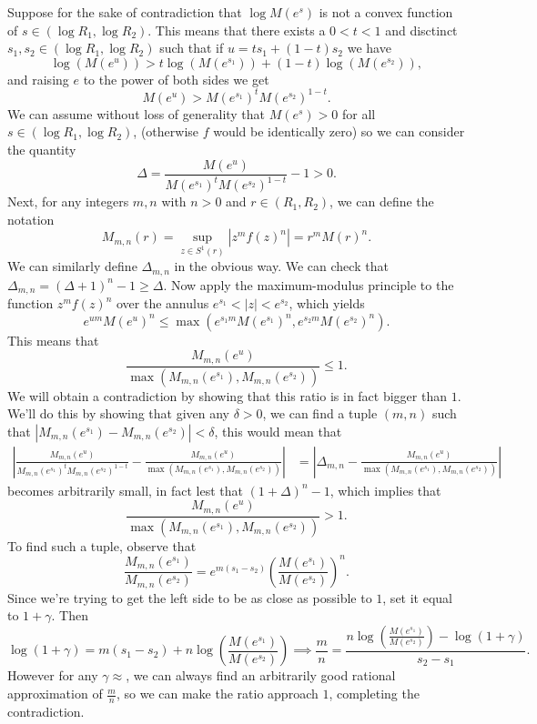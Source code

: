 \documentclass[11pt,letterpaper]{article}
\begin{document}
\begin{solution}
    Suppose for the sake of contradiction that $\log M(e^s)$ is not a convex function of $s\in (\log R_1,\log R_2)$. This means that there exists a $0 < t < 1$ and disctinct $s_1,s_2\in (\log R_1,\log R_2)$ such that if $u=ts_1+(1-t)s_2$ we have
    \[
        \log(M(e^u)) > t\log(M(e^{s_1}))+(1-t)\log(M(e^{s_2})),
    \] 
    and raising $e$ to the power of both sides we get
    \[
        M(e^u) > M(e^{s_1})^tM(e^{s_2})^{1-t}.
    \] 
    We can assume without loss of generality that $M(e^s)>0$ for all $s\in (\log R_1,\log R_2)$, (otherwise $f$ would be identically zero) so we can consider the quantity
    \[
        \Delta = \frac{M(e^u)}{M(e^{s_1})^t M(e^{s_2})^{1-t}}-1 > 0.
    \] 
    Next, for any integers $m,n$ with $n>0$ and $r\in (R_1,R_2)$, we can define the notation
    \[
        M_{m,n}(r) = \sup_{z\in S^1(r)} |z^mf(z)^n| = r^mM(r)^n.
    \] 
    We can similarly define $\Delta_{m,n}$ in the obvious way. We can check that $\Delta_{m,n}=(\Delta+1)^n-1\geq \Delta$. Now apply the maximum-modulus principle to the function $z^mf(z)^n$ over the annulus $e^{s_1}<|z|<e^{s_2}$, which yields
    \[
        e^{um}M(e^u)^n \leq \max(e^{s_1m}M(e^{s_1})^n, e^{s_2m}M(e^{s_2})^n).
    \] 
    This means that
    \[
        \frac{M_{m,n}(e^u)}{\max(M_{m,n}(e^{s_1}), M_{m,n}(e^{s_2}))} \leq 1.
    \] 
    We will obtain a contradiction by showing that this ratio is in fact bigger than $1$. We'll do this by showing that given any $\delta>0$, we can find a tuple $(m,n)$ such that $|M_{m,n}(e^{s_1})-M_{m,n}(e^{s_2})| < \delta$, this would mean that
    \[\begin{aligned}
        \left|\frac{M_{m,n}(e^{u})}{M_{m,n}(e^{s_1})^t M_{m,n}(e^{s_2})^{1-t}} - \frac{M_{m,n}(e^u)}{\max(M_{m,n}(e^{s_1}), M_{m,n}(e^{s_2}))}\right|&=\left|\Delta_{m,n}-\frac{M_{m,n}(e^u)}{\max(M_{m,n}(e^{s_1}), M_{m,n}(e^{s_2}))}\right|
    \end{aligned}\]
    becomes arbitrarily small, in fact lest that $(1+\Delta)^n-1$, which implies that
    \[
        \frac{M_{m,n}(e^{u})}{\max(M_{m,n}(e^{s_1}), M_{m,n}(e^{s_2}))} > 1.
    \] 
    To find such a tuple, observe that
    \[
        \frac{M_{m,n}(e^{s_1})}{M_{m,n}(e^{s_2})} = e^{m(s_1-s_2)}\left(\frac{M(e^{s_1})}{M(e^{s_2})}\right)^n.
    \] 
    Since we're trying to get the left side to be as close as possible to $1$, set it equal to $1+\gamma$. Then
    \[
        \log(1+\gamma) = m(s_1-s_2)+n\log\left(\frac{M(e^{s_1})}{M(e^{s_2})}\right) \implies \frac{m}{n}=\frac{n\log\left(\frac{M(e^{s_1})}{M(e^{s_2})}\right)-\log(1+\gamma)}{s_2-s_1}.
    \] 
    However for any $\gamma\approx$, we can always find an arbitrarily good rational approximation of $\frac{m}{n}$, so we can make the ratio approach $1$, completing the contradiction.
\end{solution}
\end{document}
